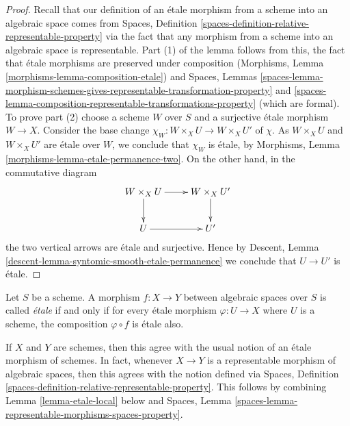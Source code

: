 \begin{proof}
Recall that our definition of an \'etale morphism from a scheme into an
algebraic space comes from
Spaces, Definition \ref{spaces-definition-relative-representable-property}
via the fact that any morphism from a scheme into an algebraic space
is representable. Part (1) of the lemma follows from this, the fact that
\'etale morphisms are preserved under composition
(Morphisms, Lemma \ref{morphisms-lemma-composition-etale})
and
Spaces, Lemmas
\ref{spaces-lemma-morphism-schemes-gives-representable-transformation-property}
and
\ref{spaces-lemma-composition-representable-transformations-property}
(which are formal).
To prove part (2) choose a scheme $W$ over $S$ and a
surjective \'etale morphism $W \to X$. Consider the base change
$\chi_W : W \times_X U \to W \times_X U'$ of $\chi$.
As $W \times_X U$ and $W \times_X U'$ are \'etale over $W$, we conclude that
$\chi_W$ is \'etale, by
Morphisms, Lemma \ref{morphisms-lemma-etale-permanence-two}.
On the other hand, in the commutative diagram
$$
\xymatrix{
W \times_X U \ar[r] \ar[d] & W \times_X U' \ar[d] \\
U \ar[r] & U'
}
$$
the two vertical arrows are \'etale and surjective.
Hence by
Descent, Lemma \ref{descent-lemma-syntomic-smooth-etale-permanence}
we conclude that $U \to U'$ is \'etale.
\end{proof}

\begin{definition}
\label{definition-etale}
Let $S$ be a scheme.
A morphism $f : X \to Y$ between algebraic spaces over $S$ is
called {\it \'etale} if and only if for every \'etale morphism
$\varphi : U \to X$ where $U$ is a scheme, the composition
$\varphi \circ f$ is \'etale also.
\end{definition}

\noindent
If $X$ and $Y$ are schemes, then this agree with the usual notion of an
\'etale morphism of schemes. In fact, whenever $X \to Y$ is a representable
morphism of algebraic spaces, then this agrees with the notion defined via
Spaces, Definition \ref{spaces-definition-relative-representable-property}.
This follows by combining Lemma \ref{lemma-etale-local} below and
Spaces, Lemma \ref{spaces-lemma-representable-morphisms-spaces-property}.

